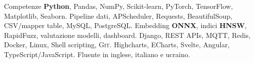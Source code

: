 

\begin{rubric}{Competenze}
	\small{\textbf{Python}, Pandas, NumPy, Scikit-learn, PyTorch, TensorFlow, Matplotlib, Seaborn.}
	\small {Pipeline dati, APScheduler, Requests, BeautifulSoup, CSV/mapper table, MySQL, PostgreSQL.}
%
	\small{Embedding \textbf{ONNX}, indici \textbf{HNSW}, RapidFuzz, valutazione modelli, dashboard.}
%
	\small{Django, REST APIs, MQTT, Redis, Docker, Linux, Shell scripting, \textsc{Git}.}
%
	\small{Highcharts, ECharts, Svelte, Angular, TypeScript/JavaScript.}
%
	\small {Fluente in inglese, italiano e ucraino.}
\end{rubric}
